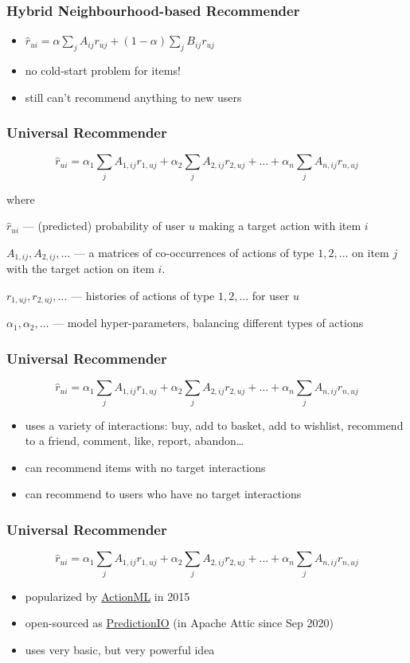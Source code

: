 \documentclass[t]{beamer}
\begin{document}
\begin{frame}
  \frametitle{Hybrid Neighbourhood-based Recommender}
  \begin{itemize}
  \item $\hat{r}_{ui}=\alpha\sum\limits_jA_{ij}r_{uj}+\left(1-\alpha\right)\sum\limits_jB_{ij}r_{uj}$
  \item no cold-start problem for items!
  \item still can't recommend anything to new users
  \end{itemize}
\end{frame}
\begin{frame}
  \frametitle{Universal Recommender} $$\hat{r}_{ui}=\alpha_1\sum\limits_jA_{1,ij}r_{1,uj}+\alpha_2\sum\limits_jA_{2,ij}r_{2,uj}+\dots+\alpha_n\sum\limits_jA_{n,ij}r_{n,uj}$$

  where

$\hat{r}_{ui}$ --- (predicted) probability of user $u$ making a target action with item $i$

$A_{1,ij},A_{2,ij},\dots$ --- a matrices of co-occurrences of actions of type $1,2,\dots$ on item $j$ with the target action on item $i$.

$r_{1,uj},r_{2,uj},\dots$ --- histories of actions of type $1,2,\dots$ for user $u$

$\alpha_1,\alpha_2,\dots$ --- model hyper-parameters, balancing different types of actions
\end{frame}
\begin{frame}
  \frametitle{Universal Recommender} $$\hat{r}_{ui}=\alpha_1\sum\limits_jA_{1,ij}r_{1,uj}+\alpha_2\sum\limits_jA_{2,ij}r_{2,uj}+\dots+\alpha_n\sum\limits_jA_{n,ij}r_{n,uj}$$
\begin{itemize}
\item uses a variety of interactions: buy, add to basket, add to wishlist, recommend to a friend, comment, like, report, abandon\dots
\item can recommend items with no target interactions
\item can recommend to users who have no target interactions
\end{itemize}
\end{frame}
\begin{frame}
  \frametitle{Universal Recommender} $$\hat{r}_{ui}=\alpha_1\sum\limits_jA_{1,ij}r_{1,uj}+\alpha_2\sum\limits_jA_{2,ij}r_{2,uj}+\dots+\alpha_n\sum\limits_jA_{n,ij}r_{n,uj}$$
\begin{itemize}
\item popularized by \href{https://actionml.com/}{ActionML} in 2015
\item open-sourced as \href{https://attic.apache.org/projects/predictionio.html}{PredictionIO} (in Apache Attic since Sep 2020)
\item uses very basic, but very powerful idea
\end{itemize}
\end{frame}
\end{document}

